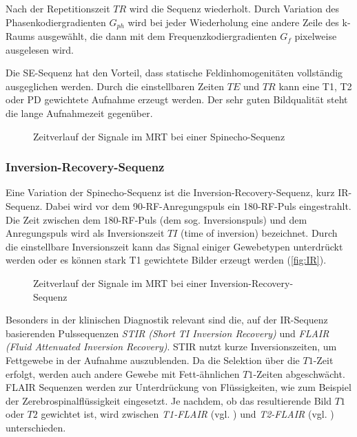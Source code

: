 Nach der Repetitionszeit $TR$ wird die Sequenz wiederholt. Durch Variation des Phasenkodiergradienten $G_{ph}$ wird bei jeder Wiederholung eine andere Zeile des k-Raums ausgewählt, die dann mit dem Frequenzkodiergradienten $G_f$ pixelweise ausgelesen wird.


Die SE-Sequenz hat den Vorteil, dass statische Feldinhomogenitäten vollständig ausgeglichen werden. Durch die einstellbaren Zeiten $TE$ und $TR$ kann eine T1, T2 oder PD gewichtete Aufnahme erzeugt werden.
Der sehr guten Bildqualität steht die lange Aufnahmezeit gegenüber.

\begin{figure}[H]
	\centering
	\caption[Spinecho-Sequenz]{Zeitverlauf der Signale im MRT bei einer Spinecho-Sequenz}
	\label{fig:SE}
\end{figure}

\subsubsection{Inversion-Recovery-Sequenz}
\label{sec:IR}
Eine Variation der Spinecho-Sequenz ist die Inversion-Recovery-Sequenz, kurz IR-Sequenz. Dabei wird vor dem 90\degree-RF-Anregungspuls ein 180\degree-RF-Puls eingestrahlt. Die Zeit zwischen dem 180\degree-RF-Puls (dem sog. Inversionspuls) und dem Anregungspuls wird als Inversionszeit $TI$ (time of inversion) bezeichnet. Durch die einstellbare Inversionszeit kann das Signal einiger Gewebetypen unterdrückt werden oder es können stark T1 gewichtete Bilder erzeugt werden (\autoref{fig:IR}).

\begin{figure}[H]
	\centering
	\caption[Inversion-Recovery-Sequenz]{Zeitverlauf der Signale im MRT bei einer Inversion-Recovery-Sequenz}
	\label{fig:IR}
\end{figure}

Besonders in der klinischen Diagnostik relevant sind die, auf der IR-Sequenz basierenden Pulssequenzen \textit{STIR (Short TI Inversion Recovery)} und \textit{FLAIR (Fluid Attenuated Inversion Recovery)}.
STIR nutzt kurze Inversionszeiten, um Fettgewebe in der Aufnahme auszublenden. Da die Selektion über die $T1$-Zeit erfolgt, werden auch andere Gewebe mit Fett-ähnlichen $T1$-Zeiten abgeschwächt\cite{Bydder1985}.
FLAIR Sequenzen werden zur Unterdrückung von Flüssigkeiten, wie zum Beispiel der Zerebrospinalflüssigkeit eingesetzt. Je nachdem, ob das resultierende Bild $T1$ oder $T2$ gewichtet ist, wird zwischen \textit{T1-FLAIR} (vgl. \cite{Melhem1997}) und \textit{T2-FLAIR} (vgl. \cite{Hajnal1992}) unterschieden\cite{Bakshi2001}.

